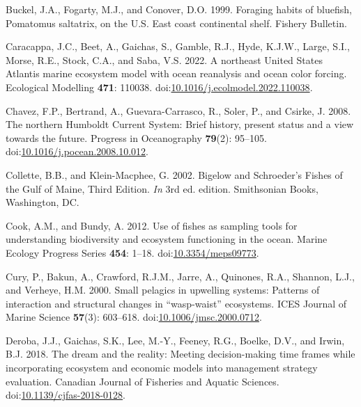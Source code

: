 \documentclass[
]{article}
\newlength{\cslhangindent}
\newlength{\cslentryspacingunit} %
\newenvironment{CSLReferences}[2] %
 {%
  \setlength{\parindent}{0pt}
  \ifodd #1
  \let\oldpar\par
  \def\par{\hangindent=\cslhangindent\oldpar}
  \fi
  \setlength{\parskip}{#2\cslentryspacingunit}
 }%
 {}
\begin{document}
\begin{CSLReferences}{1}{0}
\leavevmode{}%
Buckel, J.A., Fogarty, M.J., and Conover, D.O. 1999. Foraging habits of bluefish, {Pomatomus} saltatrix, on the {U}.{S}. East coast continental shelf. Fishery Bulletin.

\leavevmode{}%
Caracappa, J.C., Beet, A., Gaichas, S., Gamble, R.J., Hyde, K.J.W., Large, S.I., Morse, R.E., Stock, C.A., and Saba, V.S. 2022. A northeast {United} {States} {Atlantis} marine ecosystem model with ocean reanalysis and ocean color forcing. Ecological Modelling \textbf{471}: 110038. doi:\href{https://doi.org/10.1016/j.ecolmodel.2022.110038}{10.1016/j.ecolmodel.2022.110038}.

\leavevmode{}%
Chavez, F.P., Bertrand, A., Guevara-Carrasco, R., Soler, P., and Csirke, J. 2008. The northern {Humboldt} {Current} {System}: {Brief} history, present status and a view towards the future. Progress in Oceanography \textbf{79}(2): 95--105. doi:\href{https://doi.org/10.1016/j.pocean.2008.10.012}{10.1016/j.pocean.2008.10.012}.

\leavevmode{}%
Collette, B.B., and Klein-Macphee, G. 2002. Bigelow and {Schroeder}'s {Fishes} of the {Gulf} of {Maine}, {Third} {Edition}. \emph{In} 3rd ed. edition. Smithsonian Books, Washington, DC.

\leavevmode{}%
Cook, A.M., and Bundy, A. 2012. Use of fishes as sampling tools for understanding biodiversity and ecosystem functioning in the ocean. Marine Ecology Progress Series \textbf{454}: 1--18. doi:\href{https://doi.org/10.3354/meps09773}{10.3354/meps09773}.

\leavevmode{}%
Cury, P., Bakun, A., Crawford, R.J.M., Jarre, A., Quinones, R.A., Shannon, L.J., and Verheye, H.M. 2000. Small pelagics in upwelling systems: Patterns of interaction and structural changes in {``wasp-waist''} ecosystems. ICES Journal of Marine Science \textbf{57}(3): 603--618. doi:\href{https://doi.org/10.1006/jmsc.2000.0712}{10.1006/jmsc.2000.0712}.

\leavevmode{}%
Deroba, J.J., Gaichas, S.K., Lee, M.-Y., Feeney, R.G., Boelke, D.V., and Irwin, B.J. 2018. The dream and the reality: Meeting decision-making time frames while incorporating ecosystem and economic models into management strategy evaluation. Canadian Journal of Fisheries and Aquatic Sciences. doi:\href{https://doi.org/10.1139/cjfas-2018-0128}{10.1139/cjfas-2018-0128}.


\end{CSLReferences}
\end{document}
